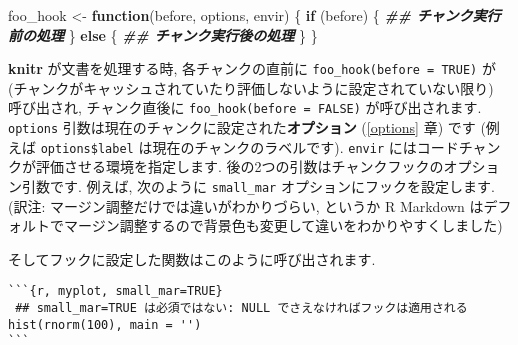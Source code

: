 \documentclass[
]{bxjsreport}
\newenvironment{Shaded}{\begin{snugshade}}{\end{snugshade}}
\newcommand{\AttributeTok}[1]{\textcolor[rgb]{0.77,0.63,0.00}{#1}}
\newcommand{\CommentTok}[1]{\textcolor[rgb]{0.56,0.35,0.01}{\textit{#1}}}
\newcommand{\ControlFlowTok}[1]{\textcolor[rgb]{0.13,0.29,0.53}{\textbf{#1}}}
\newcommand{\DecValTok}[1]{\textcolor[rgb]{0.00,0.00,0.81}{#1}}
\newcommand{\DocumentationTok}[1]{\textcolor[rgb]{0.56,0.35,0.01}{\textbf{\textit{#1}}}}
\newcommand{\FunctionTok}[1]{\textcolor[rgb]{0.00,0.00,0.00}{#1}}
\newcommand{\NormalTok}[1]{#1}
\newcommand{\OtherTok}[1]{\textcolor[rgb]{0.56,0.35,0.01}{#1}}
\newcommand{\SpecialCharTok}[1]{\textcolor[rgb]{0.00,0.00,0.00}{#1}}
\newcommand{\StringTok}[1]{\textcolor[rgb]{0.31,0.60,0.02}{#1}}
\begin{document}
\begin{Shaded}
\begin{Highlighting}[numbers=left,,]
\NormalTok{foo\_hook }\OtherTok{\textless{}{-}} \ControlFlowTok{function}\NormalTok{(before, options, envir) \{}
  \ControlFlowTok{if}\NormalTok{ (before) \{}
    \DocumentationTok{\#\# チャンク実行前の処理}
\NormalTok{  \} }\ControlFlowTok{else}\NormalTok{ \{}
    \DocumentationTok{\#\# チャンク実行後の処理}
\NormalTok{  \}}
\NormalTok{\}}
\end{Highlighting}
\end{Shaded}

\textbf{knitr} が文書を処理する時, 各チャンクの直前に
\texttt{foo\_hook(before\ =\ TRUE)} が
(チャンクがキャッシュされていたり評価しないように設定されていない限り)
呼び出され, チャンク直後に \texttt{foo\_hook(before\ =\ FALSE)}
が呼び出されます. \texttt{options}
引数は現在のチャンクに設定された\textbf{オプション} (\ref{options} 章)
です (例えば \texttt{options\$label} は現在のチャンクのラベルです).
\texttt{envir} にはコードチャンクが評価させる環境を指定します.
後の2つの引数はチャンクフックのオプション引数です. 例えば, 次のように
\texttt{small\_mar} オプションにフックを設定します. (訳注:
マージン調整だけでは違いがわかりづらい, というか R Markdown
はデフォルトでマージン調整するので背景色も変更して違いをわかりやすくしました)

\begin{Shaded}
\end{Shaded}

そしてフックに設定した関数はこのように呼び出されます.

\begin{verbatim}
```{r, myplot, small_mar=TRUE}
 ## small_mar=TRUE は必須ではない: NULL でさえなければフックは適用される
hist(rnorm(100), main = '')
```
\end{verbatim}
\end{document}
